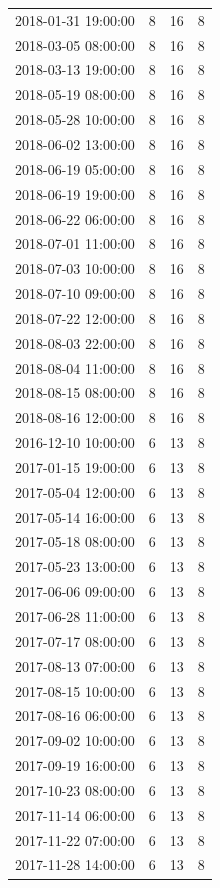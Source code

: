 \begin{tabular}{lrrr}
2018-01-31 19:00:00 & 8 & 16 & 8 \\
2018-03-05 08:00:00 & 8 & 16 & 8 \\
2018-03-13 19:00:00 & 8 & 16 & 8 \\
2018-05-19 08:00:00 & 8 & 16 & 8 \\
2018-05-28 10:00:00 & 8 & 16 & 8 \\
2018-06-02 13:00:00 & 8 & 16 & 8 \\
2018-06-19 05:00:00 & 8 & 16 & 8 \\
2018-06-19 19:00:00 & 8 & 16 & 8 \\
2018-06-22 06:00:00 & 8 & 16 & 8 \\
2018-07-01 11:00:00 & 8 & 16 & 8 \\
2018-07-03 10:00:00 & 8 & 16 & 8 \\
2018-07-10 09:00:00 & 8 & 16 & 8 \\
2018-07-22 12:00:00 & 8 & 16 & 8 \\
2018-08-03 22:00:00 & 8 & 16 & 8 \\
2018-08-04 11:00:00 & 8 & 16 & 8 \\
2018-08-15 08:00:00 & 8 & 16 & 8 \\
2018-08-16 12:00:00 & 8 & 16 & 8 \\
2016-12-10 10:00:00 & 6 & 13 & 8 \\
2017-01-15 19:00:00 & 6 & 13 & 8 \\
2017-05-04 12:00:00 & 6 & 13 & 8 \\
2017-05-14 16:00:00 & 6 & 13 & 8 \\
2017-05-18 08:00:00 & 6 & 13 & 8 \\
2017-05-23 13:00:00 & 6 & 13 & 8 \\
2017-06-06 09:00:00 & 6 & 13 & 8 \\
2017-06-28 11:00:00 & 6 & 13 & 8 \\
2017-07-17 08:00:00 & 6 & 13 & 8 \\
2017-08-13 07:00:00 & 6 & 13 & 8 \\
2017-08-15 10:00:00 & 6 & 13 & 8 \\
2017-08-16 06:00:00 & 6 & 13 & 8 \\
2017-09-02 10:00:00 & 6 & 13 & 8 \\
2017-09-19 16:00:00 & 6 & 13 & 8 \\
2017-10-23 08:00:00 & 6 & 13 & 8 \\
2017-11-14 06:00:00 & 6 & 13 & 8 \\
2017-11-22 07:00:00 & 6 & 13 & 8 \\
2017-11-28 14:00:00 & 6 & 13 & 8 \\

\end{tabular}
